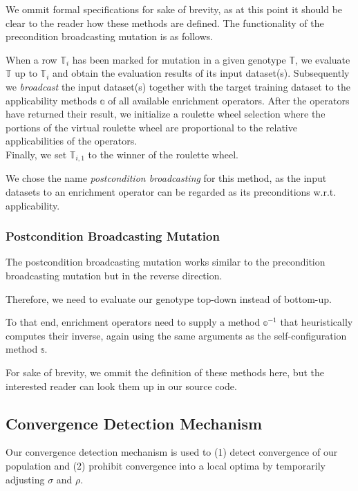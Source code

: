 We ommit formal specifications for sake of brevity, as at this point it should be clear to the reader how these methods are defined.
The functionality of the precondition broadcasting mutation is as follows.

When a row $\mathbb{T}_i$ has been marked for mutation in a given genotype $\mathbb{T}$, we evaluate $\mathbb{T}$ up to $\mathbb{T}_i$ and obtain the evaluation results of its input dataset(s).
Subsequently we \emph{broadcast} the input dataset(s) together with the target training dataset to the applicability methods $\mathbb{a}$ of all available enrichment operators.
After the operators have returned their result, we initialize a roulette wheel selection where the portions of the virtual roulette wheel are proportional to the relative applicabilities of the operators.\\

Finally, we set $\mathbb{T}_{i,1}$ to the winner of the roulette wheel.

We chose the name \emph{postcondition broadcasting} for this method, as the input datasets to an enrichment operator can be regarded as its preconditions w.r.t. applicability.

\subsubsection{Postcondition Broadcasting Mutation}

The postcondition broadcasting mutation works similar to the precondition broadcasting mutation but in the reverse direction.

Therefore, we need to evaluate our genotype top-down instead of bottom-up.

To that end, enrichment operators need to supply a method $\mathbb{o}^{-1}$ that heuristically computes their inverse, again using the same arguments as the self-configuration method $\mathbb{s}$.

For sake of brevity, we ommit the definition of these methods here, but the interested reader can look them up in our source code.

\subsection{Convergence Detection Mechanism}

Our convergence detection mechanism is used to (1) detect convergence of our population and (2) prohibit convergence into a local optima by temporarily adjusting $\sigma$ and $\rho$.\\

